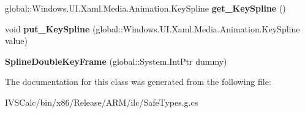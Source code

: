 \begin{DoxyCompactItemize}
global\+::\+Windows.\+U\+I.\+Xaml.\+Media.\+Animation.\+Key\+Spline {\bfseries get\+\_\+\+Key\+Spline} ()
\item 
\mbox{\label{class_windows_1_1_u_i_1_1_xaml_1_1_media_1_1_animation_1_1_spline_double_key_frame_a00a313d5fe9408d85eb21a8359970b9b}} 
void {\bfseries put\+\_\+\+Key\+Spline} (global\+::\+Windows.\+U\+I.\+Xaml.\+Media.\+Animation.\+Key\+Spline value)
\item 
\mbox{\label{class_windows_1_1_u_i_1_1_xaml_1_1_media_1_1_animation_1_1_spline_double_key_frame_a5682fdd40fc6dfc76492bfe4adbfd6ec}} 
{\bfseries Spline\+Double\+Key\+Frame} (global\+::\+System.\+Int\+Ptr dummy)
\end{DoxyCompactItemize}


The documentation for this class was generated from the following file\+:\begin{DoxyCompactItemize}
\item 
I\+V\+S\+Calc/bin/x86/\+Release/\+A\+R\+M/ilc/Safe\+Types.\+g.\+cs\end{DoxyCompactItemize}
